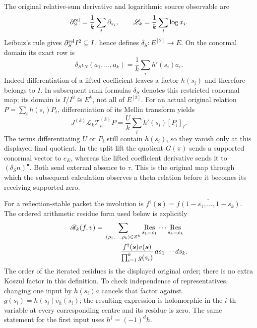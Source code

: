 The original relative-sum derivative and logarithmic source observable
are
\[
\partial_S^{\rm rel}=\frac1k\sum_i\partial_{s_i},\qquad
\mathscr L_k=\frac1k\sum_i\log x_i.
\]
Leibniz's rule gives \(\partial_S^{\rm rel}I^2\subseteq I\), hence
defines \(\delta_S:E^{[2]}\to E\).
On the conormal domain its exact row is
\[
\delta_S\iota_N(a_1,\ldots,a_k)
=\frac1k\sum_i h'(s_i)a_i.
\]
Indeed differentiation of a lifted coefficient leaves a factor
\(h(s_i)\) and therefore belongs to \(I\).
In subsequent rank formulas \(\delta_S\) denotes this restricted
conormal map; its domain is \(I/I^2\cong E^k\), not all of \(E^{[2]}\).
For an actual original relation \(P=\sum_i h(s_i)P_i\),
differentiation of its Mellin transform yields
\[
J^{(k)}\mathscr L_k\mathcal T_h^{(k)}P
=\frac Uk\sum_i h'(s_i)[P_i]_I.
\]
The terms differentiating \(U\) or \(P_i\) still contain \(h(s_i)\),
so they vanish only at this displayed final quotient.
In the split lift the quotient \(G(\pi)\) sends a supported conormal
vector to \(e_E\), whereas the lifted coefficient derivative sends it
to \((\delta_Sn)^\bullet\). Both send external absence to \(\tau\).
This is the original map through which the subsequent calculation
observes a theta relation before it becomes its receiving supported zero.

For a reflection-stable packet the involution is
\(f^\dagger(\boldsymbol s)=
\overline{f(1-\overline{s_1},\ldots,1-\overline{s_k})}\).
The ordered arithmetic residue form used below is explicitly
\[
\begin{split}
\mathscr R_k(f,v)
={}&\sum_{(\rho_1,\ldots,\rho_k)\in Z^k}
\operatorname*{Res}_{s_1=\rho_1}\cdots
\operatorname*{Res}_{s_k=\rho_k}\\
&\hspace{8mm}
\frac{f^\dagger(\boldsymbol s)v(\boldsymbol s)}
{\prod_{i=1}^k g(s_i)}\,ds_1\cdots ds_k .
\end{split}
\]
The order of the iterated residues is the displayed original order;
there is no extra Koszul factor in this definition.
To check independence of representatives, changing one input by
\(h(s_i)a\) cancels that factor against
\(g(s_i)=h(s_i)v_h(s_i)\); the resulting expression is holomorphic
in the \(i\)-th variable at every corresponding centre and its residue
is zero. The same statement for the first input uses
\(h^\dagger=(-1)^dh\).

